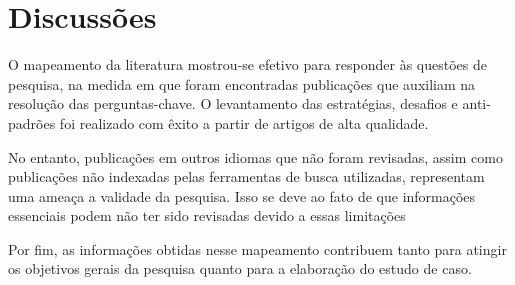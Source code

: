 \section{Discussões}
O mapeamento da literatura mostrou-se efetivo para responder às questões de pesquisa, na medida em que foram encontradas publicações que auxiliam na resolução das perguntas-chave. O levantamento das estratégias, desafios e anti-padrões foi realizado com êxito a partir de artigos de alta qualidade.

No entanto, publicações em outros idiomas que não foram revisadas, assim como publicações não indexadas pelas ferramentas de busca utilizadas, representam uma ameaça a validade da pesquisa. Isso se deve ao fato de que informações essenciais podem não ter sido revisadas devido a essas limitações

Por fim, as informações obtidas nesse mapeamento contribuem tanto para atingir os objetivos gerais da pesquisa quanto para a elaboração do estudo de caso.
